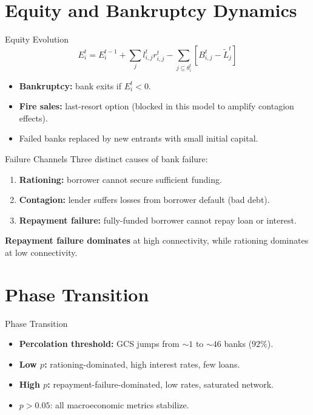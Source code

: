 \section{Equity and Bankruptcy Dynamics}\label{sec:5}

\begin{frame}{Equity Evolution}
  \[
    E^t_i = E^{t-1}_i + \sum_{j} l^{t}_{i,j} r^{t}_{i,j} - \sum_{j \subseteq \theta^t_i} \left[ B^{t}_{i,j} - \tilde{L}^t_j \right]
  \]
  \begin{itemize}
    \item \textbf{Bankruptcy:} bank exits if $E_i^t < 0$.
    \item \textbf{Fire sales:} last-resort option (blocked in this model to amplify contagion effects).
    \item Failed banks replaced by new entrants with small initial capital.
  \end{itemize}
\end{frame}


\begin{frame}{Failure Channels}
  Three distinct causes of bank failure:
  \begin{enumerate}
    \item \textbf{Rationing:} borrower cannot secure sufficient funding.
    \item \textbf{Contagion:} lender suffers losses from borrower default (bad debt).
    \item \textbf{Repayment failure:} fully-funded borrower cannot repay loan or interest.
  \end{enumerate}
  \vspace{0.3cm}
  \textbf{Repayment failure dominates} at high connectivity, while rationing dominates at low connectivity.
\end{frame}



\section{Phase Transition}\label{sec:6}

\begin{frame}[shrink=0.1]{Phase Transition}
  \begin{itemize}
    \item \textbf{Percolation threshold:} GCS jumps from $\sim 1$ to $\sim 46$ banks ($92\%$).
    \item \textbf{Low $p$:} rationing-dominated, high interest rates, few loans.
    \item \textbf{High $p$:} repayment-failure-dominated, low rates, saturated network.
    \item $p > 0.05$: all macroeconomic metrics stabilize.
  \end{itemize}
\end{frame}

